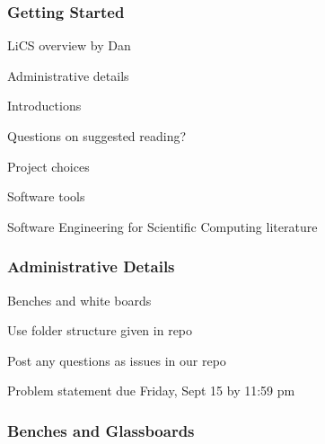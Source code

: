 \documentclass[t,12pt,numbers,fleqn]{beamer}
\begin{document}




\begin{frame}
\frametitle{Getting Started}

\bi
\item LiCS overview by Dan
\item Administrative details
\item Introductions
\item Questions on suggested reading?
\item Project choices
\item Software tools
\item Software Engineering for Scientific Computing literature
\ei

\end{frame}


\begin{frame}
\frametitle{Administrative Details}

\bi
\item Benches and white boards
\item Use folder structure given in repo
\item Post any questions as issues in our repo
\item Problem statement due Friday, Sept 15 by 11:59 pm
\ei

\end{frame}


\begin{frame}
\frametitle{Benches and Glassboards}


\end{frame}
\end{document}
